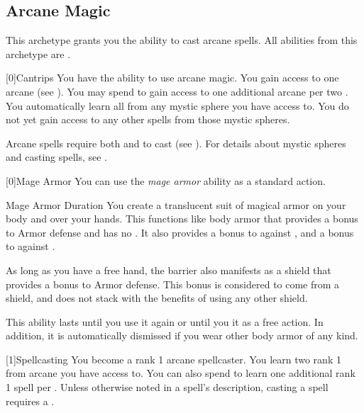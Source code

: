     \newpage
    \subsection{Arcane Magic}
        This archetype grants you the ability to cast arcane spells.
        All abilities from this archetype are .

        [0]{Cantrips}
        You have the ability to use arcane magic.
        You gain access to one arcane  (see ).
        You may spend  to gain access to one additional arcane  per two .
        You automatically learn all  from any mystic sphere you have access to.
        You do not yet gain access to any other spells from those mystic spheres.

        Arcane spells require both  and  to cast (see ).
        For details about mystic spheres and casting spells, see .

        [0]{Mage Armor} You can use the \textit{mage armor} ability as a standard action.
        \begin{durationability}{Mage Armor}
            Duration
            \rankline
            You create a translucent suit of magical armor on your body and over your hands.
            This functions like body armor that provides a  bonus to Armor defense and has no .
            It also provides a  bonus to  against , and a  bonus to  against .

            As long as you have a free hand, the barrier also manifests as a shield that provides a  bonus to Armor defense.
            This bonus is considered to come from a shield, and does not stack with the benefits of using any other shield.

            This ability lasts until you use it again or until you  it as a free action.
            In addition, it is automatically dismissed if you wear other body armor of any kind.
        \end{durationability}

        [1]{Spellcasting}
        You become a rank 1 arcane spellcaster.
        You learn two rank 1  from arcane  you have access to.
        You can also spend  to learn one additional rank 1 spell per .
        Unless otherwise noted in a spell's description, casting a spell requires a .

